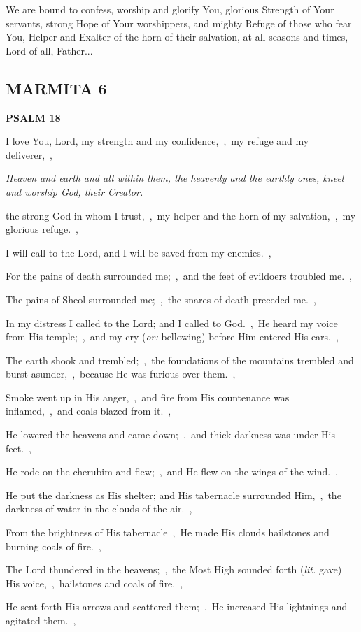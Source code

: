 \documentclass[12pt,twoside,a5paper]{article}
\newcommand{\marmita}[1]{\subsection*{MARMITA {#1}}}
\newcommand{\psalm}[1]{\textbf{PSALM {#1}}\nopagebreak}
\newcommand{\qanona}[1]{{\liturgicalhint{Qanona.} \emph{#1}}}
\newcommand{\slota}[1]{\liturgicalhint{Slota.} #1}
\newcommand{\translationoption}[1]{\emph{or:} #1}
\newcommand{\translationliteral}[1]{\emph{lit.} #1}
\begin{document}
\slota{We are bound to confess, worship and glorify You, glorious Strength of Your servants, strong Hope of Your worshippers, and mighty Refuge of those who fear You, Helper and Exalter of the horn of their salvation, at all seasons and times, Lord of all, Father...}

\marmita{6}
\psalm{18}

\begin{normalparskip}
  I love You, Lord, my strength and my confidence,~\sep\ my refuge and my deliverer,~\sep

  \qanona{Heaven and earth and all within them, the heavenly and the earthly ones, kneel and worship God, their Creator.}

  the strong God in whom I trust,~\sep\ my helper and the horn of my salvation,~\sep\ my glorious refuge.~\sep

  I will call to the Lord, and I will be saved from my enemies.~\sep

  For the pains of death surrounded me;~\sep\ and the feet of evildoers troubled me.~\sep

  The pains of Sheol surrounded me;~\sep\ the snares of death preceded me.~\sep

  In my distress I called to the Lord; and I called to God.~\sep\ He heard my voice from His temple;~\sep\ and my cry (\translationoption{bellowing}) before Him entered His ears.~\sep

  The earth shook and trembled;~\sep\ the foundations of the mountains trembled and burst asunder,~\sep\ because He was furious over them.~\sep

  Smoke went up in His anger,~\sep\ and fire from His countenance was inflamed,~\sep\ and coals blazed from it.~\sep

  He lowered the heavens and came down;~\sep\ and thick darkness was under His feet.~\sep

  He rode on the cherubim and flew;~\sep\ and He flew on the wings of the wind.~\sep

  He put the darkness as His shelter; and His tabernacle surrounded Him,~\sep\ the darkness of water in the clouds of the air.~\sep

  From the brightness of His tabernacle~\sep\ He made His clouds hailstones and burning coals of fire.~\sep

  The Lord thundered in the heavens;~\sep\ the Most High sounded forth (\translationliteral{gave}) His voice,~\sep\ hailstones and coals of fire.~\sep

  He sent forth His arrows and scattered them;~\sep\ He increased His lightnings and agitated them.~\sep


\end{normalparskip}
\end{document}
